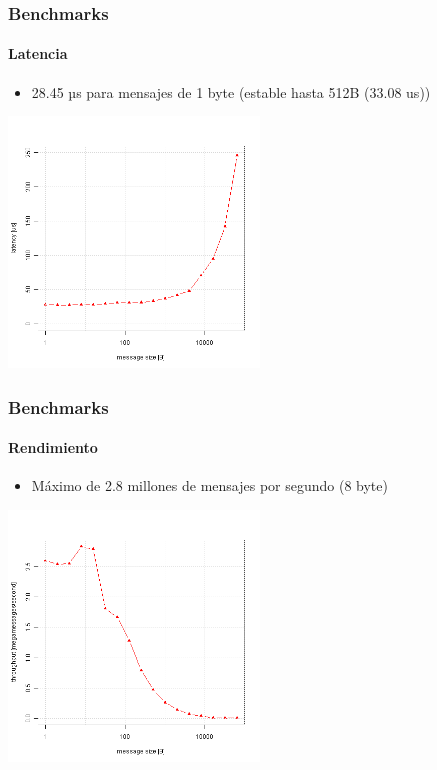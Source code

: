 \begin{frame}
    \frametitle{Benchmarks}
    \framesubtitle{Latencia}
    \begin{itemize}
        \item 28.45 µs para mensajes de 1 byte (estable hasta 512B (33.08 us))
    \end{itemize}
    \begin{center}
        \includegraphics[width=0.5\textwidth]{img/latency}
    \end{center}
\end{frame}

\begin{frame}
    \frametitle{Benchmarks}
    \framesubtitle{Rendimiento}
    \begin{itemize}
        \item Máximo de 2.8 millones de mensajes por segundo (8 byte)
    \end{itemize}
    \begin{center}
        \includegraphics[width=0.5\textwidth]{img/throughput}
    \end{center}
\end{frame}

